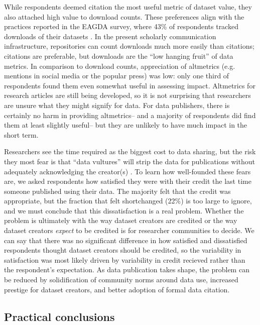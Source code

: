 \documentclass[10pt]{article}
\begin{document}
While respondents deemed citation the most useful metric of dataset value, they also attached high value to download counts.
These preferences align with the practices reported in the EAGDA survey, where 43\% of respondents tracked downloads of their datasets \cite{bobrow_establishing_2014}.
In the present scholarly communication infrastructure, repositories can count downloads much more easily than citations; citations are preferable, but downloads are the ``low hanging fruit'' of data metrics.
In comparison to download counts, appreciation of altmetrics (e.g. mentions in social media or the popular press) was low: only one third of respondents found them even somewhat useful in assessing impact.
Altmetrics for research articles are still being developed, so it is not surprising that researchers are unsure what they might signify for data.
For data publishers, there is certainly no harm in providing altmetrics-- and a majority of respondents did find them at least slightly useful-- but they are unlikely to have much impact in the short term.

Researchers see the time required as the biggest cost to data sharing, but the risk they most fear is that ``data vultures'' will strip the data for publications without adequately acknowledging the creator(s) \cite{kim_institutional_2012}.
To learn how well-founded these fears are, we asked respondents how satisfied they were with their credit the last time someone published using their data.
The majority felt that the credit was appropriate, but the fraction that felt shortchanged (22\%) is too large to ignore, and we must conclude that this dissatisfaction is a real problem.
Whether the problem is ultimately with the way dataset creators are credited or the way dataset creators \textit{expect} to be credited is for researcher communities to decide.
We can say that there was no significant difference in how satisfied and dissatisfied respondents thought dataset creators should be credited, so the variability in satisfaction was most likely driven by variability in credit recieved rather than the respondent's expectation.
As data publication takes shape, the problem can be reduced by solidification of community norms around data use, increased prestige for dataset creators, and better adoption of formal data citation.

\subsection*{Practical conclusions}
\end{document}
